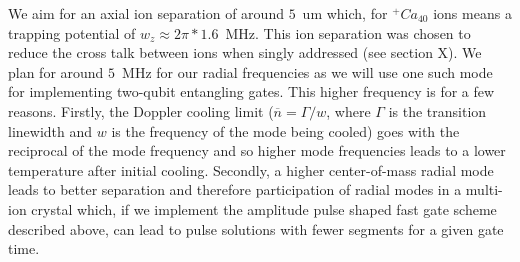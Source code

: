 \documentclass[12pt]{iopart}
\begin{document}


We aim for an axial ion
separation of around $5$~um which, for $^+Ca_{40}$ ions means a
trapping potential of $w_z \approx 2\pi * 1.6$~MHz. This ion
separation was chosen to reduce the cross talk between ions when
singly addressed (see section X). We plan for around $5$~MHz for our
radial frequencies as we will use one such mode for implementing
two-qubit entangling gates. This higher frequency is for a few
reasons. Firstly, the Doppler cooling limit
($\overline{n} = \Gamma/w$, where $\Gamma$ is the transition linewidth
and $w$ is the frequency of the mode being cooled) goes with the
reciprocal of the mode frequency and so higher mode frequencies leads
to a lower temperature after initial cooling. Secondly, a higher
center-of-mass radial mode leads to better separation and therefore
participation of radial modes in a multi-ion crystal which, if we
implement the amplitude pulse shaped fast gate scheme described above,
can lead to pulse solutions with fewer segments for a given gate time.
\end{document}
